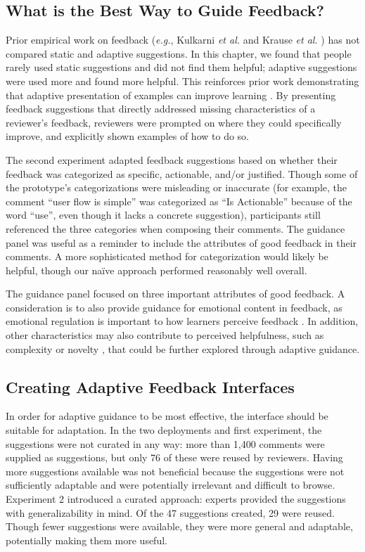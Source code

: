 \subsection{What is the Best Way to Guide Feedback?}
Prior empirical work on feedback (\textit{e.g.}, Kulkarni \textit{et al.} \cite{kulkarni2013peer} and Krause \textit{et al.} \cite{Krause2017}) has not compared static and adaptive suggestions. In this chapter, we found that people rarely used static suggestions and did not find them helpful; adaptive suggestions were used more and found more helpful. This reinforces prior work demonstrating that adaptive presentation of examples can improve learning \cite{Lee2010, Najar2014}. By presenting feedback suggestions that directly addressed missing characteristics of a reviewer's feedback, reviewers were prompted on where they could specifically improve, and explicitly shown examples of how to do so. 

The second experiment adapted feedback suggestions based on whether their feedback was categorized as specific, actionable, and/or justified. Though some of the prototype's categorizations were misleading or inaccurate (for example, the comment ``user flow is simple'' was categorized as ``Is Actionable'' because of the word ``use'', even though it lacks a concrete suggestion), participants still referenced the three categories when composing their comments. The guidance panel was useful as a reminder to include the attributes of good feedback in their comments. A more sophisticated method for categorization would likely be helpful, though our naïve approach performed reasonably well overall.

The guidance panel focused on three important attributes of good feedback. A consideration is to also provide guidance for emotional content in feedback, as emotional regulation is important to how learners perceive feedback \cite{Krause2017, Varlander2008}. In addition, other characteristics may also contribute to perceived helpfulness, such as complexity or novelty \cite{Krause2017}, that could be further explored through adaptive guidance.

\subsection{Creating Adaptive Feedback Interfaces}
In order for adaptive guidance to be most effective, the interface should be suitable for adaptation. In the two deployments and first experiment, the suggestions were not curated in any way: more than 1,400 comments were supplied as suggestions, but only 76 of these were reused by reviewers. Having more suggestions available was not beneficial because the suggestions were not sufficiently adaptable and were potentially irrelevant and difficult to browse. Experiment 2 introduced a curated approach: experts provided the suggestions with generalizability in mind. Of the 47 suggestions created, 29 were reused. Though fewer suggestions were available, they were more general and adaptable, potentially making them more useful. 

